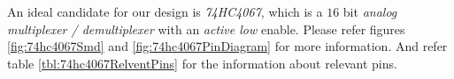 \documentclass[../../main]{subfiles}
\begin{document}
An ideal candidate for our design is \emph{74HC4067}, which is a $16$ bit
\emph{analog multiplexer / demultiplexer} with an \emph{active low} enable. Please refer figures
\ref{fig:74hc4067Smd} and \ref{fig:74hc4067PinDiagram} for more information. And refer table
\ref{tbl:74hc4067RelventPins} for the information about relevant pins.
\end{document}
